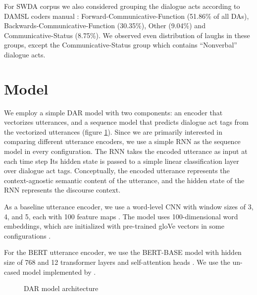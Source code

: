 \documentclass[11pt,a4paper]{article}
\begin{document}
For SWDA corpus we also considered grouping the dialogue acts according to DAMSL coders manual \citep{jurafskySwitchboardSWBDDAMSLShallowDiscourseFunction1997a}: Forward-Communicative-Function (51.86\% of all DAs), Backwards-Communicative-Function (30.35\%), Other (9.04\%) and Communicative-Status (8.75\%). We observed even distribution of laughs in these groups, except the Communicative-Status group which contains ``Nonverbal'' dialogue acts.

  
\section{Model} %

We employ a simple DAR model with two components: an encoder that vectorizes utterances, and a sequence model that predicts dialogue act tags from the vectorized utterances (figure \ref{fig:model-architecture}).
Since we are primarily interested in comparing different utterance encoders, we use a simple RNN as the sequence model in every configuration. 
The RNN takes the encoded utterance as input at each time step
Its hidden state is passed to a simple linear classification layer over dialogue act tags.
Conceptually, the encoded utterance represents the context-agnostic semantic content of the utterance, and the hidden state of the RNN represents the discourse context.

As a baseline utterance encoder, we use a word-level CNN with window sizes of 3, 4, and 5, each with 100 feature maps \citep{kimConvolutionalNeuralNetworks2014}. 
The model uses 100-dimensional word embeddings, which are initialized with pre-trained gloVe vectors in some configurations \citep{penningtonGloveGlobalVectors2014}.

For the BERT utterance encoder, we use the BERT-BASE model with hidden size of 768 and 12 transformer layers and self-attention heads \citep[][see \S3.1]{devlinBERTPretrainingDeep2018}.
We use the un-cased model implemented by \citet{wolfHuggingFaceTransformersStateoftheart2019}.

\begin{figure}
  
  \caption{DAR model architecture}
  \label{fig:model-architecture}
\end{figure}
\end{document}

